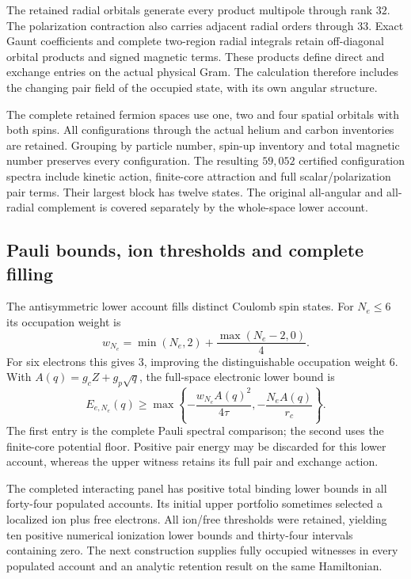 The retained radial orbitals generate every product multipole through rank $32$. The polarization contraction also carries adjacent radial orders through $33$. Exact Gaunt coefficients and complete two-region radial integrals retain off-diagonal orbital products and signed magnetic terms. These products define direct and exchange entries on the actual physical Gram. The calculation therefore includes the changing pair field of the occupied state, with its own angular structure.

The complete retained fermion spaces use one, two and four spatial orbitals with both spins. All configurations through the actual helium and carbon inventories are retained. Grouping by particle number, spin-up inventory and total magnetic number preserves every configuration. The resulting $59{,}052$ certified configuration spectra include kinetic action, finite-core attraction and full scalar/polarization pair terms. Their largest block has twelve states. The original all-angular and all-radial complement is covered separately by the whole-space lower account.

\subsection{Pauli bounds, ion thresholds and complete filling}

The antisymmetric lower account fills distinct Coulomb spin states. For $N_e\leq6$ its occupation weight is
\[
 w_{N_e}=\min(N_e,2)+\frac{\max(N_e-2,0)}4.
\]
For six electrons this gives $3$, improving the distinguishable occupation weight $6$. With $A(q)=g_cZ+g_p\sqrt q$, the full-space electronic lower bound is
\[
 E_{e,N_e}(q)\geq
 \max\left\{-\frac{w_{N_e}A(q)^2}{4\tau},
                  -\frac{N_eA(q)}{r_c}\right\}.
\]
The first entry is the complete Pauli spectral comparison; the second uses the finite-core potential floor. Positive pair energy may be discarded for this lower account, whereas the upper witness retains its full pair and exchange action. 

The completed interacting panel has positive total binding lower bounds in all forty-four populated accounts. Its initial upper portfolio sometimes selected a localized ion plus free electrons. All ion/free thresholds were retained, yielding ten positive numerical ionization lower bounds and thirty-four intervals containing zero. The next construction supplies fully occupied witnesses in every populated account and an analytic retention result on the same Hamiltonian. 

